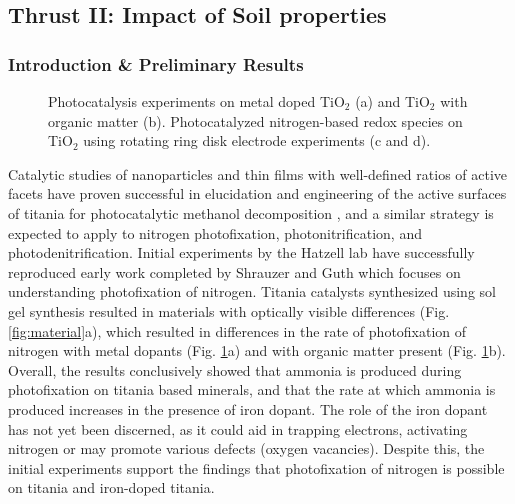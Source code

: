 \newpage
\subsection{Thrust II: Impact of Soil properties}
\label{sec:SA3}
\vspace{1mm}
\subsubsection*{Introduction \& Preliminary Results}
\vspace{1mm}
\begin{figure}
\centering
\vspace{-1mm}
\caption{Photocatalysis experiments on metal doped TiO$_2$ (a) and TiO$_2$ with organic matter (b). Photocatalyzed nitrogen-based redox species on TiO$_2$ using rotating ring disk electrode experiments (c and d). }
\label{fig:experiments}
\vspace{-2mm}
\end{figure}Catalytic studies of nanoparticles and thin films with well-defined ratios of active facets have proven successful in elucidation and engineering of the active surfaces of titania for photocatalytic methanol decomposition \cite{Bennett_2016,Cargnello_2016}, and a similar strategy is expected to apply to nitrogen photofixation, photonitrification, and photodenitrification.  Initial experiments by the Hatzell lab have successfully reproduced early work completed by Shrauzer and Guth which focuses on understanding photofixation of nitrogen\cite{Schrauzer1977}. Titania catalysts synthesized using sol gel synthesis resulted in materials with optically visible differences (Fig. \ref{fig:material}a), which resulted in differences in the rate of photofixation of nitrogen with metal dopants (Fig. \ref{fig:experiments}a) and with organic matter present (Fig. \ref{fig:experiments}b). Overall, the results conclusively showed that ammonia is produced during photofixation on titania based minerals, and that the rate at which ammonia is produced increases in the presence of iron dopant. The role of the iron dopant has not yet been discerned, as it could aid in trapping electrons, activating nitrogen or may promote various defects (oxygen vacancies). Despite this, the initial experiments support the findings that photofixation of nitrogen is possible on titania and iron-doped titania. 




